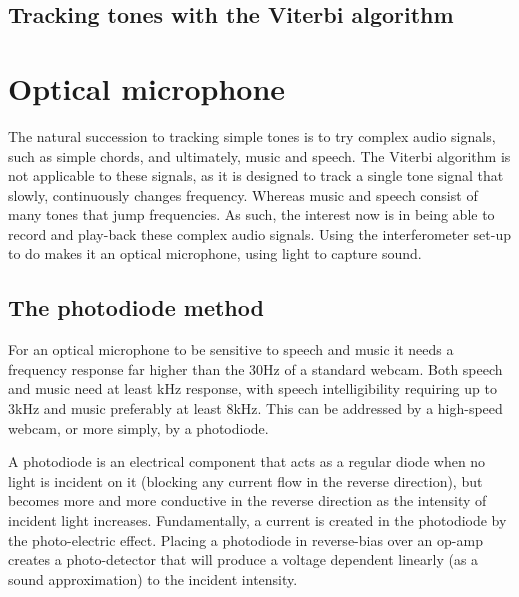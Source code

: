 \documentclass[prb,preprint]{revtex4-1}
\newcommand{\jam}{\textcolor{magenta}}
\begin{document}



\subsection{Tracking tones with the Viterbi algorithm}


\section{Optical microphone}

The natural succession to tracking simple tones is to try complex audio signals, such as simple chords, and ultimately, music and speech. The Viterbi algorithm is not applicable to these signals, as it is designed to track a single tone signal that slowly, continuously changes frequency. Whereas music and speech consist of many tones that jump frequencies. As such, the interest now is in being able to record and play-back these complex audio signals. Using the interferometer set-up to do makes it an optical microphone, using light to capture sound.

\subsection{The photodiode method}

For an optical microphone to be sensitive to speech and music it needs a frequency response far higher than the 30Hz of a standard webcam. Both speech and music need at least kHz response, with speech intelligibility requiring up to 3kHz and music preferably at least 8kHz. This can be addressed by a high-speed webcam, or more simply, by a photodiode.


A photodiode is an electrical component that acts as a regular diode when no light is incident on it (blocking any current flow in the reverse direction), but becomes more and more conductive in the reverse direction as the intensity of incident light increases. Fundamentally, a current is created in the photodiode by the photo-electric effect. Placing a photodiode in reverse-bias over an op-amp creates a photo-detector that will produce a voltage dependent linearly (as a sound approximation) to the incident intensity.
\end{document}
